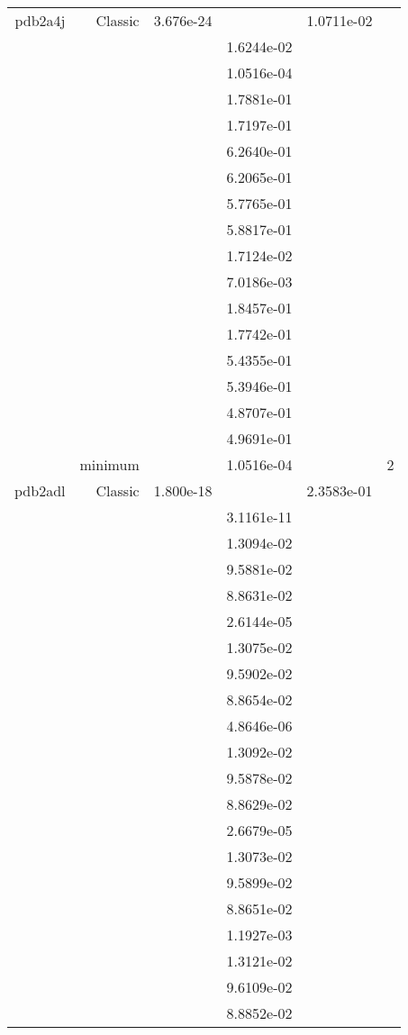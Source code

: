 \begin{xltabular}{\textwidth}{r|rS[table-format=1.3e+2]S[table-format=1.4e+2]S[table-format=1.4e+2]S[table-format=-1.5]}
pdb2a4j & Classic & 3.676e-24 &  & 1.0711e-02 & \\
&  &  & 1.6244e-02 & & \\
&  &  & 1.0516e-04 & & \\
&  &  & 1.7881e-01 & & \\
&  &  & 1.7197e-01 & & \\
&  &  & 6.2640e-01 & & \\
&  &  & 6.2065e-01 & & \\
&  &  & 5.7765e-01 & & \\
&  &  & 5.8817e-01 & & \\
&  &  & 1.7124e-02 & & \\
&  &  & 7.0186e-03 & & \\
&  &  & 1.8457e-01 & & \\
&  &  & 1.7742e-01 & & \\
&  &  & 5.4355e-01 & & \\
&  &  & 5.3946e-01 & & \\
&  &  & 4.8707e-01 & & \\
&  &  & 4.9691e-01 & & \\
& minimum &  & 1.0516e-04 & & 2 \\  \addlinespace
pdb2adl & Classic & 1.800e-18 &  & 2.3583e-01 & \\
&  &  & 3.1161e-11 & & \\
&  &  & 1.3094e-02 & & \\
&  &  & 9.5881e-02 & & \\
&  &  & 8.8631e-02 & & \\
&  &  & 2.6144e-05 & & \\
&  &  & 1.3075e-02 & & \\
&  &  & 9.5902e-02 & & \\
&  &  & 8.8654e-02 & & \\
&  &  & 4.8646e-06 & & \\
&  &  & 1.3092e-02 & & \\
&  &  & 9.5878e-02 & & \\
&  &  & 8.8629e-02 & & \\
&  &  & 2.6679e-05 & & \\
&  &  & 1.3073e-02 & & \\
&  &  & 9.5899e-02 & & \\
&  &  & 8.8651e-02 & & \\
&  &  & 1.1927e-03 & & \\
&  &  & 1.3121e-02 & & \\
&  &  & 9.6109e-02 & & \\
&  &  & 8.8852e-02 & & \\

\end{xltabular}
